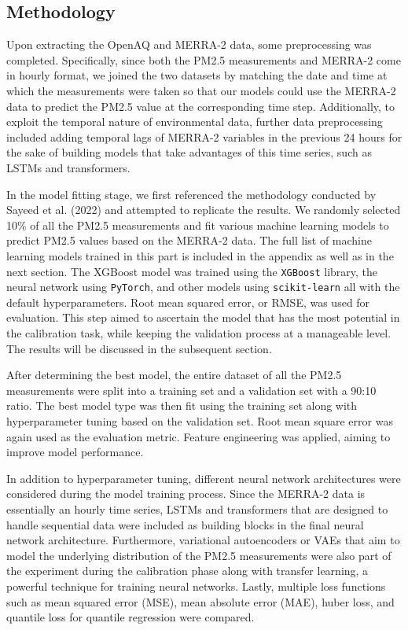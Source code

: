 \documentclass[draft]{agujournal2019}
\begin{document}
\subsection{Methodology}

Upon extracting the OpenAQ and MERRA-2 data, some preprocessing was completed. Specifically, since both the PM2.5 measurements and MERRA-2 come in hourly format, we joined the two datasets by matching the date and time at which the measurements were taken so that our models could use the MERRA-2 data to predict the PM2.5 value at the corresponding time step. Additionally, to exploit the temporal nature of environmental data, further data preprocessing included adding temporal lags of MERRA-2 variables in the previous 24 hours for the sake of building models that take advantages of this time series, such as LSTMs and transformers.

In the model fitting stage, we first referenced the methodology conducted by Sayeed et al. (2022) and attempted to replicate the results. We randomly selected 10\% of all the PM2.5 measurements and fit various machine learning models to predict PM2.5 values based on the MERRA-2 data. The full list of machine learning models trained in this part is included in the appendix as well as in the next section. The XGBoost model was trained using the \texttt{XGBoost} library, the neural network using \texttt{PyTorch}, and other models using \texttt{scikit-learn} all with the default hyperparameters. Root mean squared error, or RMSE, was used for evaluation. This step aimed to ascertain the model that has the most potential in the calibration task, while keeping the validation process at a manageable level. The results will be discussed in the subsequent section.

After determining the best model, the entire dataset of all the PM2.5 measurements were split into a training set and a validation set with a 90:10 ratio. The best model type was then fit using the training set along with hyperparameter tuning based on the validation set. Root mean square error was again used as the evaluation metric. Feature engineering was applied, aiming to improve model performance.

In addition to hyperparameter tuning, different neural network architectures were considered during the model training process. Since the MERRA-2 data is essentially an hourly time series, LSTMs and transformers that are designed to handle sequential data were included as building blocks in the final neural network architecture. Furthermore, variational autoencoders or VAEs that aim to model the underlying distribution of the PM2.5 measurements were also part of the experiment during the calibration phase along with transfer learning, a powerful technique for training neural networks. Lastly, multiple loss functions such as mean squared error (MSE), mean absolute error (MAE), huber loss, and quantile loss for quantile regression were compared.
\end{document}
